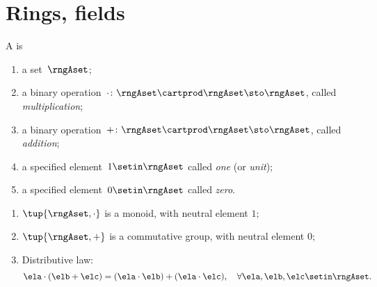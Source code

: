 
\section{Rings, fields}
\label{sec:rings-fields}




\begin{ctdefinition}[Ring]
    \label{def:ring}
    A  is
    \begin{body}
        \constit
        \begin{enumerate}
            \item a set~$\rngAset$;
            \item a binary operation~$\cdot \colon \rngAset \cartprod \rngAset \sto \rngAset$, called \emph{multiplication};
            \item a binary operation~$+ \colon \rngAset \cartprod \rngAset \sto \rngAset$, called \emph{addition};
            \item a specified element~$1 \setin \rngAset$ called \emph{one} (or \emph{unit});
            \item a specified element~$0 \setin \rngAset$ called \emph{zero}.
        \end{enumerate}
        \condit
        \begin{enumerate}
            \item $\tup{\rngAset, \cdot}$ is a monoid, with neutral element $1$;
            \item $\tup{\rngAset, +}$ is a commutative group, with neutral element $0$;
            \item Distributive law:
                  \begin{equation}
                      \label{eq:distributive-law}
                      \ela \cdot (\elb + \elc) = (\ela \cdot \elb) + (\ela \cdot \elc), \quad \forall \ela, \elb, \elc \setin \rngAset.
                  \end{equation}
        \end{enumerate}
    \end{body}
\end{ctdefinition}





